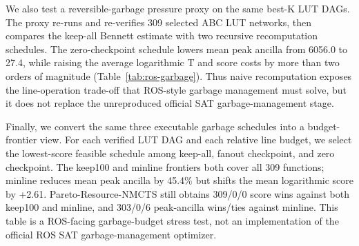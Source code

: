 \documentclass[11pt]{article}
\newcommand{\method}{Resource-NMCTS}
\begin{document}
\begin{table}[H]
\centering
\small
\caption{Line-aware reselection of the verified ROS-style LUT proxy sweep.}
\label{tab:ros-line}

\end{table}

We also test a reversible-garbage pressure proxy on the same best-K LUT DAGs.
The proxy re-runs and re-verifies 309 selected ABC LUT networks, then compares
the keep-all Bennett estimate with two recursive recomputation schedules.  The
zero-checkpoint schedule lowers mean peak ancilla from 6056.0 to 27.4, while
raising the average logarithmic T and score costs by more than two orders of
magnitude (Table~\ref{tab:ros-garbage}).  Thus naive recomputation exposes the
line-operation trade-off that ROS-style garbage management must solve, but it
does not replace the unreproduced official SAT garbage-management stage.

\begin{table}[H]
\centering
\small
\caption{ROS-style LUT garbage-management proxy over the verified best-K LUT
DAGs.  Logarithms are row-wise means over 309 functions; lower peak ancilla is
reported together with the operation blow-up.}
\label{tab:ros-garbage}

\end{table}

Finally, we convert the same three executable garbage schedules into a
budget-frontier view.  For each verified LUT DAG and each relative line budget,
we select the lowest-score feasible schedule among keep-all, fanout checkpoint,
and zero checkpoint.  The keep100 and minline frontiers both cover all 309
functions; minline reduces mean peak ancilla by 45.4\% but shifts the mean
logarithmic score by +2.61.  Pareto-\method{} still obtains 309/0/0 score wins
against both keep100 and minline, and 303/0/6 peak-ancilla wins/ties against
minline.  This table is a ROS-facing garbage-budget stress test, not an
implementation of the official ROS SAT garbage-management optimizer.

\begin{table}[H]
\centering
\small
\caption{ROS-style LUT garbage budget frontier over verified best-K LUT DAGs.
The frontier selects among executable proxy schedules under relative
peak-ancilla budgets; it is not the official ROS SAT garbage-management flow.}
\label{tab:ros-garbage-budget-frontier}

\end{table}
\end{document}
